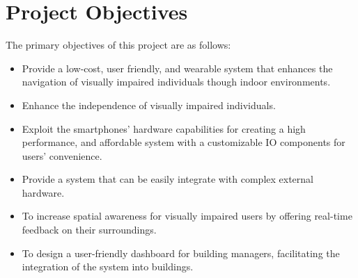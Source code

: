 \section{Project Objectives}

The primary objectives of this project are as follows:

\begin{itemize}
	\item Provide a low-cost, user friendly, and wearable system that enhances the navigation of visually impaired individuals though indoor environments.
	\item Enhance the independence of visually impaired individuals.
	\item Exploit the smartphones' hardware capabilities for creating a high performance, and affordable system with a customizable IO components for users' convenience.
	\item Provide a system that can be easily integrate with complex external hardware.
	\item To increase spatial awareness for visually impaired users by offering real-time feedback on their surroundings.
	\item To design a user-friendly dashboard for building managers, facilitating the integration of the system into buildings.
\end{itemize}
